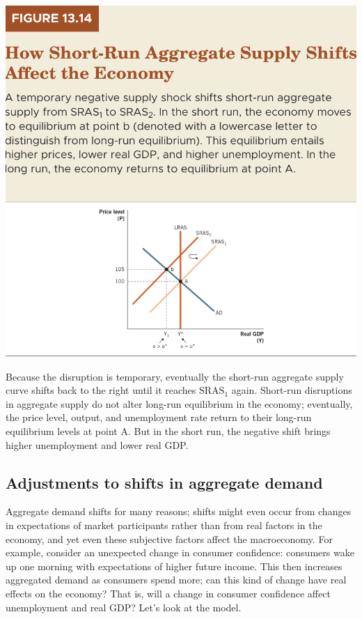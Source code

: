 \documentclass[11pt]{article} %
\begin{document}
\begin{center}
\includegraphics[scale=0.5]{images/Figure 13.14.png} 
\end{center}

Because the disruption is temporary, eventually the short-run aggregate supply curve shifts back to the right until it reaches \(\text{SRAS}_1\) again. Short-run disruptions in aggregate supply do not alter long-run equilibrium in the economy; eventually, the price level, output, and unemployment rate return to their long-run equilibrium levels at point A. But in the short run, the negative shift brings higher unemployment and lower real GDP.

\subsection*{Adjustments to shifts in aggregate demand}
Aggregate demand shifts for many reasons; shifts might even occur from changes in expectations of market participants rather than from real factors in the economy, and yet even these subjective factors affect the macroeconomy. For example, consider an unexpected change in consumer confidence: consumers wake up one morning with expectations of higher future income. This then increases aggregated demand as consumers spend more; can this kind of change have real effects on the economy? That is, will a change in consumer confidence affect unemployment and real GDP? Let's look at the model.
\end{document}
